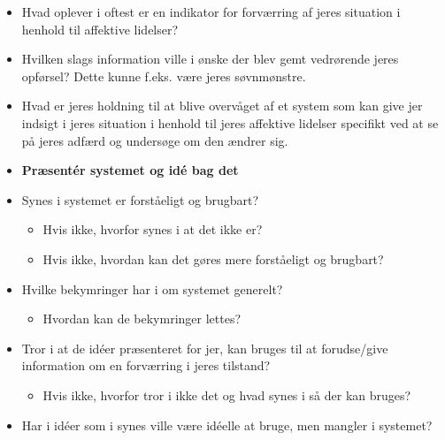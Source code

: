 \begin{itemize}
\item Hvad oplever i oftest er en indikator for forværring af jeres situation i henhold til affektive lidelser?
\item Hvilken slags information ville i ønske der blev gemt vedrørende jeres opførsel? Dette kunne f.eks. være jeres søvnmønstre.
\item Hvad er jeres holdning til at blive overvåget af et system som kan give jer indsigt i jeres situation i henhold til jeres affektive lidelser specifikt ved at se på jeres adfærd og undersøge om den ændrer sig.
\item \textbf{Præsentér systemet og idé bag det}
\item {Synes i systemet er forståeligt og brugbart?
	   \begin{itemize}
	   \item Hvis ikke, hvorfor synes i at det ikke er?
	   \item Hvis ikke, hvordan kan det gøres mere forståeligt og brugbart?
	   \end{itemize}}
\item {Hvilke bekymringer har i om systemet generelt?
	  \begin{itemize}
	  \item Hvordan kan de bekymringer lettes?
	  \end{itemize}}
\item {Tror i at de idéer præsenteret for jer, kan bruges til at forudse/give information om en forværring i jeres tilstand?
	   \begin{itemize}
	   \item Hvis ikke, hvorfor tror i ikke det og hvad synes i så der kan bruges?
	   \end{itemize}}
\item Har i idéer som i synes ville være idéelle at bruge, men mangler i systemet?

\end{itemize}